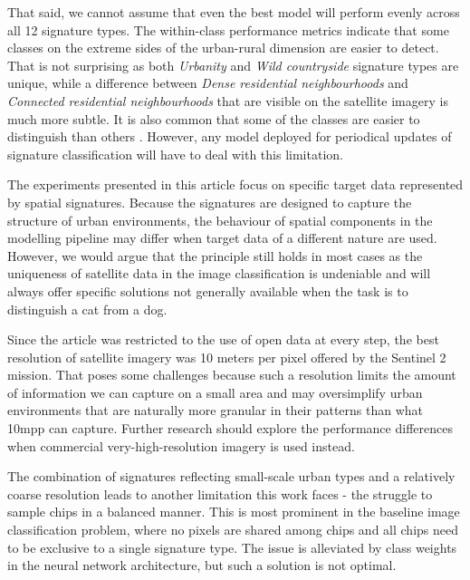 That said, we cannot assume that even the best model will perform evenly across all 12
signature types. The within-class performance metrics indicate that some classes on the
extreme sides of the urban-rural dimension are easier to detect. That is not surprising
as both \textit{Urbanity} and \textit{Wild countryside} signature types are unique,
while a difference between \textit{Dense residential neighbourhoods} and
\textit{Connected residential neighbourhoods} that are visible on the satellite imagery
is much more subtle. It is also common that some of the classes are easier to
distinguish than others \cite{zanaga_daniele_2021_5571936, karra2021global}. However,
any model deployed for periodical updates of signature classification will have to deal
with this limitation.

The experiments presented in this article focus on specific target data represented by
spatial signatures. Because the signatures are designed to capture the structure of urban
environments, the behaviour of spatial components in the modelling pipeline may differ
when target data of a different nature are used. However, we would argue that the
principle still holds in most cases as the uniqueness of satellite data in the image
classification is undeniable and will always offer specific solutions not generally
available when the task is to distinguish a cat from a dog.

Since the article was restricted to the use of open data at every step, the best
resolution of satellite imagery was 10 meters per pixel offered by the Sentinel 2
mission. That poses some challenges because such a resolution limits the amount of
information we can capture on a small area and may oversimplify urban environments that
are naturally more granular in their patterns than what 10mpp can capture. Further
research should explore the performance differences when commercial very-high-resolution
imagery is used instead.

The combination of signatures reflecting small-scale urban types and a relatively coarse
resolution leads to another limitation this work faces - the struggle to sample chips
in a balanced manner. This is most prominent in the baseline image classification
problem, where no pixels are shared among chips and all chips need to be exclusive to a
single signature type. The issue is alleviated by class weights in the neural network
architecture, but such a solution is not optimal.


